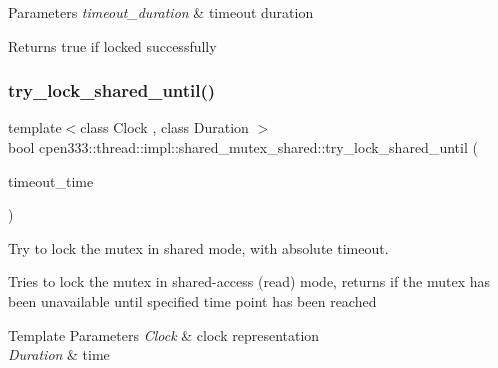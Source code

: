 \begin{DoxyParams}{Parameters}
{\em timeout\+\_\+duration} & timeout duration \\
\hline
\end{DoxyParams}
\begin{DoxyReturn}{Returns}
true if locked successfully 
\end{DoxyReturn}
\mbox{\label{classcpen333_1_1thread_1_1impl_1_1shared__mutex__shared_a2e55208ed6d24f5ff3112998ff2f50c5}} 
\subsubsection{\texorpdfstring{try\+\_\+lock\+\_\+shared\+\_\+until()}{try\_lock\_shared\_until()}}
{\footnotesize\ttfamily template$<$class Clock , class Duration $>$ \\
bool cpen333\+::thread\+::impl\+::shared\+\_\+mutex\+\_\+shared\+::try\+\_\+lock\+\_\+shared\+\_\+until (\begin{DoxyParamCaption}\item[{const std\+::chrono\+::time\+\_\+point$<$ Clock, Duration $>$ \&}]{timeout\+\_\+time }\end{DoxyParamCaption})\hspace{0.3cm}{\ttfamily [inline]}}



Try to lock the mutex in shared mode, with absolute timeout. 

Tries to lock the mutex in shared-\/access (read) mode, returns if the mutex has been unavailable until specified time point has been reached


\begin{DoxyTemplParams}{Template Parameters}
{\em Clock} & clock representation \\
\hline
{\em Duration} & time \\
\hline
\end{DoxyTemplParams}

